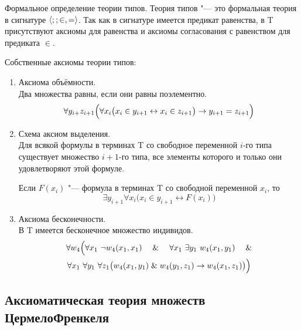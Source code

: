 \begin{undefthm}{Формальное определение теории типов.}
	Теория типов "--- это формальная теория в сигнатуре $ \Braket{;; \in, =} $.
	Так как в сигнатуре имеется предикат равенства, в \bt T присутствуют аксиомы для равенства и аксиомы согласования с равенством для предиката $ \in $.

	Собственные аксиомы теории типов:
	\begin{enumerate}
		\item Аксиома объёмности. \\
			Два множества равны, если они равны поэлементно.
			$$ \forall y_{i + }z_{i + 1} \Bigl( \forall x_i \bigl( x_i \in y_{i + 1} \leftrightarrow x_i \in z_{i + 1} \bigr) \to y_{i + 1} = z_{i + 1} \Bigr) $$
			
		\item Схема аксиом выделения. \\
			Для всякой формулы в терминах \bt T со свободное переменной $ i $-го типа существует множество $ i + 1 $-го типа, все элементы которого и только они удовлетворяют этой формуле.

			Если $ F(x_i) $ "--- формула в терминах \bt T со свободной переменной $ x_i $, то
			$$ \exists y_{i + 1} \forall x_i \bigl( x_i \in y_{i + 1} \leftrightarrow F(x_i) \bigr) $$

		\item Аксиома бесконечности. \\
			В \bt T имеется бесконечное множество индивидов.
			\begin{multline*}
				\forall w_4 \Bigl( \forall x_1 ~\neg w_4(x_1, x_1) \quad \mathrel\& \quad \forall x_1 ~ \exists y_1~ w_4(x_1, y_1) \quad \mathrel\& \\
				\forall x_1 ~ \forall y_1 ~ \forall z_1 \bigl( w_4(x_1, y_1) \mathrel\& w_4(y_1, z_1) \to w_4(x_1, z_1) \bigr) \Bigr)
			\end{multline*}
	\end{enumerate}
\end{undefthm}

\subsection*{Аксиоматическая теория множеств ЦермелоФренкеля}

